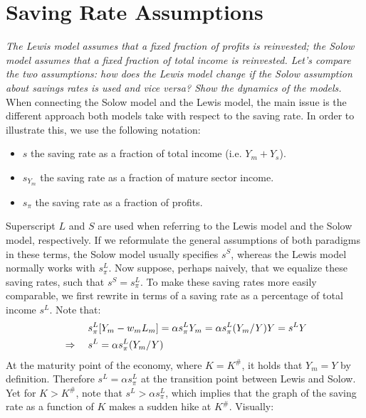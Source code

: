 \documentclass[a4paper]{article}
\begin{document}
\section{Saving Rate Assumptions}
\textit{The Lewis model assumes that a fixed fraction of profits is reinvested; the Solow model assumes that a fixed fraction of total income is reinvested. Let’s compare the two assumptions: how does the Lewis model change if the Solow assumption about savings rates is used and vice versa? Show the dynamics of the models.}\\
\newline
When connecting the Solow model and the Lewis model, the main issue is the different approach both models take with respect to the saving rate. In order to illustrate this, we use the following notation:
\begin{itemize}
\item \hspace{0.1cm}$s$ \hspace{1cm}the saving rate as a fraction of total income (i.e. $Y_m+Y_s$). \vspace{-0.1cm}
\item \hspace{0.1cm}$s_{Y_m}$ \hspace{0.59cm}the saving rate as a fraction of mature sector income. \vspace{-0.1cm}
\item \hspace{0.1cm}$s_{\pi}$ \hspace{0.81cm}the saving rate as a fraction of profits.
\end{itemize}
Superscript $L$ and $S$ are used when referring to the Lewis model and the Solow model, respectively. If we reformulate the general assumptions of both paradigms in these terms, the Solow model usually specifies $s^S$, whereas the Lewis model normally works with $s_{\pi}^L$. Now suppose, perhaps naively, that we equalize these saving rates, such that $s^S=s_{\pi}^L$. To make these saving rates more easily comparable, we first rewrite  in terms of a saving rate as a percentage of total income $s^L$. Note that:
\begin{alignat}{2}
	&{}							&&s_{\pi}^L[Y_m-w_mL_m]={\alpha}s_{\pi}^LY_m={\alpha}s_{\pi}^L(Y_m/Y)Y=s^LY\nonumber\\
    &\Rightarrow\hspace{0.1cm}	&&s^L={\alpha}s_{\pi}^L(Y_m/Y)
\end{alignat}
At the maturity point of the economy, where $K=K^{\#}$, it holds that $Y_m=Y$ by definition. Therefore $s^L={\alpha}s_{\pi}^L$ at the transition point between Lewis and Solow. Yet for $K>K^{\#}$, note that $s^L>{\alpha}s_{\pi}^L$, which implies that the graph of the saving rate as a function of $K$ makes a sudden hike at $K^{\#}$. Visually:
\end{document}
